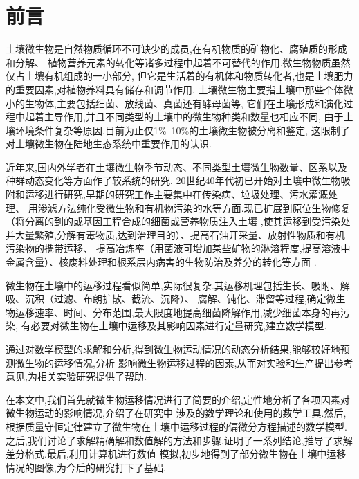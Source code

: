 \chapter*{前言}
土壤微生物是自然物质循环不可缺少的成员,在有机物质的矿物化、腐殖质的形成和分解、
植物营养元素的转化等诸多过程中起着不可替代的作用.微生物物质虽然仅占土壤有机组成的一小部分,
但它是生活着的有机体和物质转化者,也是土壤肥力的重要因素,对植物养料具有储存和调节作用.
土壤微生物主要指土壤中那些个体微小的生物体,主要包括细菌、放线菌、真菌还有酵母菌等,
它们在土壤形成和演化过程中起着主导作用,并且不同类型的土壤中的微生物种类和数量也相应不同,
由于土壤环境条件复杂等原因,目前为止仅1\%--10\%的土壤微生物被分离和鉴定,
这限制了对土壤微生物在陆地生态系统中重要作用的认识.\par
近年来,国内外学者在土壤微生物季节动态、不同类型土壤微生物数量、区系以及种群动态变化等方面作了较系统的研究,
20世纪40年代初已开始对土壤中微生物吸附和运移进行研究,早期的研究工作主要集中在传染病、垃圾处理、污水灌溉处理、
用渗滤方法纯化受微生物和有机物污染的水等方面.现已扩展到原位生物修复（将分离的到的或基因工程合成的细菌或营养物质注入土壤
,使其运移到受污染处并大量繁殖,分解有毒物质,达到治理目的）、提高石油开采量、放射性物质和有机污染物的携带运移、
提高冶炼率（用菌液可增加某些矿物的淋溶程度,提高溶液中金属含量）、核废料处理和根系层内病害的生物防治及养分的转化等方面
.\par
微生物在土壤中的运移过程看似简单,实际很复杂.其运移机理包括生长、吸附、解吸、沉积（过滤、布朗扩散、截流、沉降）、
腐解、钝化、滞留等过程,确定微生物运移速率、时间、分布范围,最大限度地提高细菌降解作用,减少细菌本身的再污染,
有必要对微生物在土壤中运移及其影响因素进行定量研究,建立数学模型.\par
通过对数学模型的求解和分析,得到微生物运动情况的动态分析结果,能够较好地预测微生物的运移情况,分析
影响微生物运移过程的因素,从而对实验和生产提出参考意见,为相关实验研究提供了帮助.\par
在本文中,我们首先就微生物运移情况进行了简要的介绍,定性地分析了各项因素对微生物运动的影响情况,介绍了在研究中
涉及的数学理论和使用的数学工具.然后,根据质量守恒定律建立了微生物在土壤中运移过程的偏微分方程描述的数学模型.
之后,我们讨论了求解精确解和数值解的方法和步骤,证明了一系列结论,推导了求解差分格式.最后,利用计算机进行数值
模拟,初步地得到了部分微生物在土壤中运移情况的图像,为今后的研究打下了基础.
